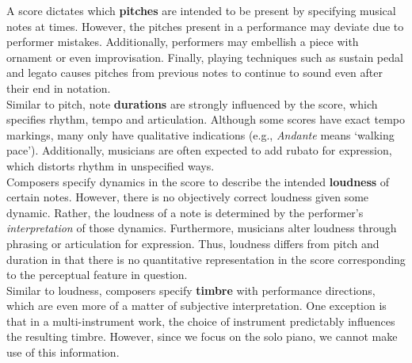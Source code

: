 A score dictates which \textbf{pitches} are intended to be present by specifying musical notes at times. However, the pitches present in a performance may deviate due to performer mistakes. Additionally, performers may embellish a piece with \gls{ornament} or even improvisation. Finally, playing techniques such as \gls{sustain pedal} and \gls{legato} causes pitches from previous notes to continue to sound even after their end in notation. \\

Similar to pitch, note \textbf{durations} are strongly influenced by the score, which specifies \gls{rhythm}, \gls{tempo} and \gls{articulation}. Although some scores have exact tempo markings, many only have qualitative indications (e.g., \textit{Andante} means `walking pace'). Additionally, musicians are often expected to add \gls{rubato} for expression, which distorts rhythm in unspecified ways.\\

Composers specify \gls{dynamics} in the score to describe the intended \textbf{loudness} of certain notes. However, there is no objectively correct loudness given some dynamic. Rather, the loudness of a note is determined by the performer's \textit{interpretation} of those dynamics. Furthermore, musicians alter loudness through \gls{phrasing} or articulation for expression. Thus, loudness differs from pitch and duration in that there is no quantitative representation in the score corresponding to the perceptual feature in question.  \\


Similar to loudness, composers specify \textbf{\gls{timbre}} with performance directions, which are even more of a matter of subjective interpretation. One exception is that in a multi-instrument work, the choice of instrument predictably influences the resulting timbre. However, since we focus on the solo piano, we cannot make use of this information.\\ 

